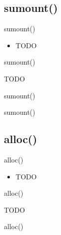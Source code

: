 \documentclass{beamer}
\begin{document}


\subsection{sumount()}

\begin{frame}{sumount()}
    \begin{itemize}
        \item TODO
    \end{itemize}
\end{frame}

\begin{frame}{sumount()}
    \begin{algorithmic}[1]
        \State TODO
    \end{algorithmic}
\end{frame}

\begin{frame}{sumount()}
\end{frame}

\begin{frame}{sumount()}
\end{frame}




\subsection{alloc()}

\begin{frame}{alloc()}
    \begin{itemize}
        \item TODO
    \end{itemize}
\end{frame}

\begin{frame}{alloc()}
    \begin{algorithmic}[1]
        \State TODO
    \end{algorithmic}
\end{frame}

\begin{frame}{alloc()}
\end{frame}
\end{document}
